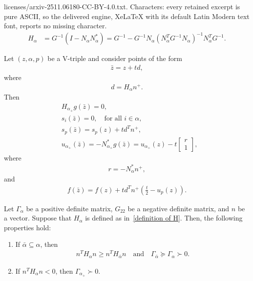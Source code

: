 \documentclass[10pt,a4paper]{amsart}
\begin{document}
licenses/arxiv-2511.06180-CC-BY-4.0.txt. Characters: every retained excerpt is pure ASCII, so the delivered engine, XeLaTeX with its default Latin Modern text font, reports no missing character.
	\begin{align}\label{definition of H}
		H_{\alpha} &= G^{-1}(I - N_{\alpha}N_{\alpha}^{\ast}) 
		= G^{-1} - G^{-1}N_{\alpha}(N_{\alpha}^{T}G^{-1}N_{\alpha})^{-1}N_{\alpha}^{T}G^{-1}.
	\end{align}

	\begin{lemma}\label{lemma of z}
		Let $(z, \alpha, p)$ be a V-triple and consider points of the form
		\begin{align}\label{definition of z-}
			\bar{z} = z + td,
		\end{align}
		where
		\begin{align}\label{definition of d}
			d = H_{\alpha}n^{+}.
		\end{align}
		Then
		\begin{align}
			& H_{\alpha_{+}} g(\bar{z}) = 0,\\
			& s_{i}(\bar{z}) = 0, \quad \text{for all } i \in \alpha,\\
			& s_{p}(\bar{z}) = s_{p}(z) + td^{T}n^{+},\\
			& u_{\alpha_{+}}(\bar{z}) = -N_{\alpha_{+}}^{\ast} g(\bar{z}) = u_{\alpha_{+}}(z) - t
			\begin{bmatrix}
				r\\
				1
			\end{bmatrix}, \label{definition of u}
		\end{align}
		where
		\begin{align}\label{definition of r}
			r = -N_{\alpha}^{\ast}n^{+},
		\end{align}
		and
		\begin{align}
			f(\bar{z}) = f(z) + td^{T}n^{+}\left(\frac{t}{2} - u_{p}(z)\right).
		\end{align}
	\end{lemma}

	\begin{lemma}\label{lemma positive}
		Let $\Gamma_{\alpha}$ be a positive definite matrix, $G_{22}$ be a negative definite matrix, and $n$ be a vector. Suppose that $H_{\alpha}$ is defined as in~\eqref{definition of H}. Then, the following properties hold:
		\begin{enumerate}
			\item If $\bar{\alpha} \subseteq \alpha$, then
			\begin{align}
				n^{T}H_{\alpha}n \geq n^{T}H_{\bar{\alpha}}n
				\quad\text{and}\quad
				\Gamma_{\bar{\alpha}} \succeq \Gamma_{\alpha} \succ 0.
			\end{align}
			\item If $n^{T}H_{\alpha}n < 0$, then $\Gamma_{\alpha_{+}} \succ 0$.
		\end{enumerate}
	\end{lemma}
\end{document}
